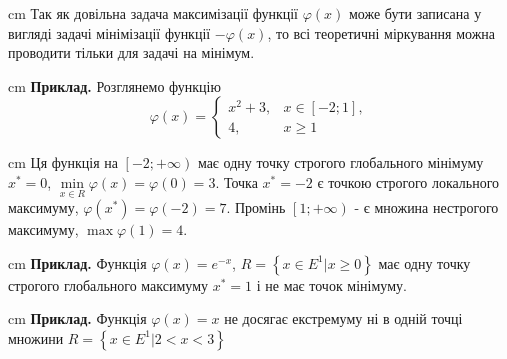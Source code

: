 \documentclass[12pt,a4paper]{article}
\begin{document}
\begin{flushleft}
\parbox{14,5 cm}{ cm  Так як довільна задача максимізації функції $\varphi\left(x\right)$ може бути записана у вигляді задачі мінімізації функції $-\varphi\left(x\right)$, то всі теоретичні міркування можна проводити тільки для задачі на мінімум.}
\end{flushleft}
\begin{flushleft}
\parbox{14,5 cm}{ cm  \textbf{Приклад.} Розглянемо функцію 
\begin{displaymath}
\varphi\left(x\right) = \left\{ \begin{array}{ll}
{x}^2+3, & x\in\left[-2;1\right],\\
4, & x\ge 1
\end{array} \right.
\end{displaymath}}
\end{flushleft}
\begin{figure}[hb!]
\end{figure}
\begin{flushleft}
\parbox{14,5 cm}{ cm  Ця функція на $\left [-2; +\infty \right )$ має одну точку строгого глобального мінімуму ${x}^*=0$, $\min\limits_{x \in R}{\varphi\left(x\right)}=\varphi\left(0\right)=3$. Точка ${x}^*=-2$ є точкою строгого локального максимуму, $\varphi\left({x}^*\right)=\varphi\left(-2\right)=7$. Промінь $\left [1; +\infty \right )$ - є множина нестрогого максимуму, $\max {\varphi\left(1\right)}=4$.}
\end{flushleft}
\begin{flushleft}
\parbox{14,5 cm}{ cm   \textbf{Приклад.} Функція $\varphi\left(x\right)={e}^{-x}$, $R = \left\{ x \in {E}^1 | x\ge 0\right\}$ має одну точку строгого глобального максимуму ${x}^*=1$ і не має точок мінімуму.}
\end{flushleft}
\begin{flushleft}
\parbox{14,5 cm}{ cm  \textbf{Приклад.}  Функція $\varphi\left(x\right)=x$ не досягає екстремуму ні в одній точці множини $R = \left\{ x \in {E}^1 | 2 < x < 3 \right\}$}
\end{flushleft}
\end{document}
